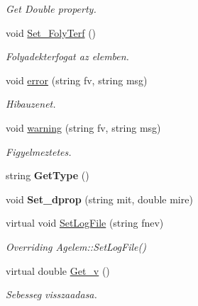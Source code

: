 \begin{DoxyCompactItemize}
\begin{DoxyCompactList}\small\item\em Get Double property. \end{DoxyCompactList}\item 
void \hyperlink{class_csatorna_a4d75a74c04c6a66600068e98f055f2b4}{Set\+\_\+\+Foly\+Terf} ()\hypertarget{class_csatorna_a4d75a74c04c6a66600068e98f055f2b4}{}\label{class_csatorna_a4d75a74c04c6a66600068e98f055f2b4}

\begin{DoxyCompactList}\small\item\em Folyadekterfogat az elemben. \end{DoxyCompactList}\item 
void \hyperlink{class_csatorna_a765dd9b66d2a18b567a6045d17266a10}{error} (string fv, string msg)
\begin{DoxyCompactList}\small\item\em Hibauzenet. \end{DoxyCompactList}\item 
void \hyperlink{class_csatorna_ac2000669171af7d8fa5f447cb8aa231d}{warning} (string fv, string msg)
\begin{DoxyCompactList}\small\item\em Figyelmeztetes. \end{DoxyCompactList}\item 
string {\bfseries Get\+Type} ()\hypertarget{class_csatorna_a6b1b895f6b560b8bb3a517c48b12210e}{}\label{class_csatorna_a6b1b895f6b560b8bb3a517c48b12210e}

\item 
void {\bfseries Set\+\_\+dprop} (string mit, double mire)\hypertarget{class_csatorna_aa1895b07dd2d4b836f0efbe0869cd4e1}{}\label{class_csatorna_aa1895b07dd2d4b836f0efbe0869cd4e1}

\item 
virtual void \hyperlink{class_csatorna_a0b0b43ad04feb2e0cf60a6d027387ff9}{Set\+Log\+File} (string fnev)\hypertarget{class_csatorna_a0b0b43ad04feb2e0cf60a6d027387ff9}{}\label{class_csatorna_a0b0b43ad04feb2e0cf60a6d027387ff9}

\begin{DoxyCompactList}\small\item\em Overriding Agelem\+::\+Set\+Log\+File() \end{DoxyCompactList}\item 
virtual double \hyperlink{class_csatorna_a74db8402dcaaf02c408c1ac900a610f9}{Get\+\_\+v} ()\hypertarget{class_csatorna_a74db8402dcaaf02c408c1ac900a610f9}{}\label{class_csatorna_a74db8402dcaaf02c408c1ac900a610f9}

\begin{DoxyCompactList}\small\item\em Sebesseg visszaadasa. \end{DoxyCompactList}\end{DoxyCompactItemize}
